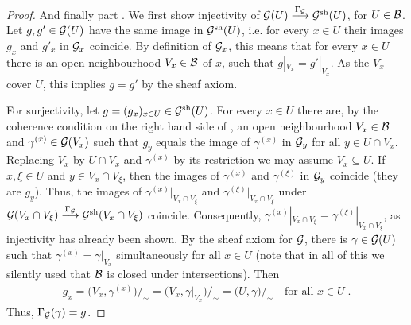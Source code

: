 \documentclass[a4paper,parskip=half,numbers=enddot, DIV=12]{scrreprt}
\begin{document}
\begin{proof}
	And finally part . We first show injectivity of $\Gg(U)\morphism[\Gamma_\Gg] \Gg^\sh(U)$, for $U\in \mathcal{B}$. Let $g,g'\in \mathcal{G}(U)$ have the same image in $\mathcal{G}^{\mathrm{sh}}(U)$, i.e. for every $x\in U$ their images $g_x$ and $g'_x$ in $\mathcal{G}_x$ coincide. By definition of $\mathcal{G}_x$, this means that for every $x\in U$ there is an open neighbourhood $V_x\in\mathcal{B}$ of $x$, such that $g|_{V_x}=g'|_{V_x}$. As the $V_x$ cover $U$, this implies $g=g'$ by the sheaf axiom.
	
	For surjectivity, let $g=(g_x)_{x\in U}\in \mathcal{G}^{\mathrm{sh}}(U)$. For every $x\in U$ there are, by the coherence condition on the right hand side of , an open neighbourhood $V_x\in\mathcal{B}$ and $\gamma^{(x)}\in \mathcal{G}(V_x)$ such that $g_y$ equals the image of $\gamma^{(x)}$ in $\mathcal{G}_y$ for all $y\in U\cap V_x$. Replacing $V_x$ by $U\cap V_x$ and $\gamma^{(x)}$ by its restriction we may assume $V_x\subseteq U$. If $x,\xi\in U$ and $y\in V_x\cap V_\xi$, then the images of $\gamma^{(x)}$ and $\gamma^{(\xi)}$ in $\mathcal{G}_y$ coincide (they are $g_y$). Thus, the images of $\gamma^{(x)}|_{V_x\cap V_\xi}$ and $ \gamma^{(\xi)}|_{V_x\cap V_\xi}$ under $\Gg(V_x\cap V_\xi ) \morphism[\Gamma_\Gg] \Gg^\sh(V_x\cap V_\xi)$ coincide. Consequently,  $\gamma^{(x)}|_{V_x\cap V_\xi} = \gamma^{(\xi)}|_{V_x\cap V_\xi}$, as injectivity has already been shown. By the sheaf axiom for $\mathcal{G}$, there is $\gamma\in \mathcal{G}(U)$ such that $\gamma^{(x)}=\gamma|_{V_x}$ simultaneously for all $x\in U$ (note that in all of this we silently used that $\mathcal{B}$ is closed under intersections). Then 
	\begin{align*}
		g_x=\big(V_x, \gamma^{(x)}\big)/_\sim = \big(V_x,\gamma|_{V_x}\big)/_\sim = \big(U,\gamma\big)/_\sim\quad\text{for all }x\in U\;. 
	\end{align*}
	Thus, $\Gamma_{\mathcal{G}}(\gamma) = g$.
\end{proof}
\end{document}
